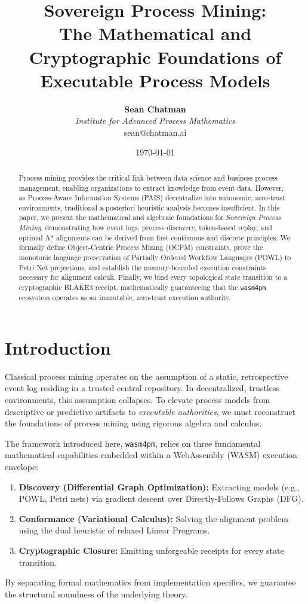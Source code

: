 \documentclass[11pt,a4paper,twocolumn]{article}
\title{\Huge \textbf{Sovereign Process Mining:} \\ \Large The Mathematical and Cryptographic Foundations of Executable Process Models}
\author{
    \textbf{Sean Chatman}\\
    \textit{Institute for Advanced Process Mathematics}\\
    sean@chatman.ai
}
\date{\today}
\begin{document}
\maketitle

\begin{abstract}
Process mining provides the critical link between data science and business process management, enabling organizations to extract knowledge from event data. However, as Process-Aware Information Systems (PAIS) decentralize into autonomic, zero-trust environments, traditional a-posteriori heuristic analysis becomes insufficient. In this paper, we present the mathematical and algebraic foundations for \textit{Sovereign Process Mining}, demonstrating how event logs, process discovery, token-based replay, and optimal A* alignments can be derived from first continuous and discrete principles. We formally define Object-Centric Process Mining (OCPM) constraints, prove the monotonic language preservation of Partially Ordered Workflow Languages (POWL) to Petri Net projections, and establish the memory-bounded execution constraints necessary for alignment calculi. Finally, we bind every topological state transition to a cryptographic BLAKE3 receipt, mathematically guaranteeing that the \texttt{wasm4pm} ecosystem operates as an immutable, zero-trust execution authority.
\end{abstract}

\section{Introduction}
Classical process mining operates on the assumption of a static, retrospective event log residing in a trusted central repository. In decentralized, trustless environments, this assumption collapses. To elevate process models from descriptive or predictive artifacts to \textit{executable authorities}, we must reconstruct the foundations of process mining using rigorous algebra and calculus.

The framework introduced here, \texttt{wasm4pm}, relies on three fundamental mathematical capabilities embedded within a WebAssembly (WASM) execution envelope:
\begin{enumerate}
    \item \textbf{Discovery (Differential Graph Optimization):} Extracting models (e.g., POWL, Petri nets) via gradient descent over Directly-Follows Graphs (DFG).
    \item \textbf{Conformance (Variational Calculus):} Solving the alignment problem using the dual heuristic of relaxed Linear Programs.
    \item \textbf{Cryptographic Closure:} Emitting unforgeable receipts for every state transition.
\end{enumerate}
By separating formal mathematics from implementation specifics, we guarantee the structural soundness of the underlying theory.
\end{document}
